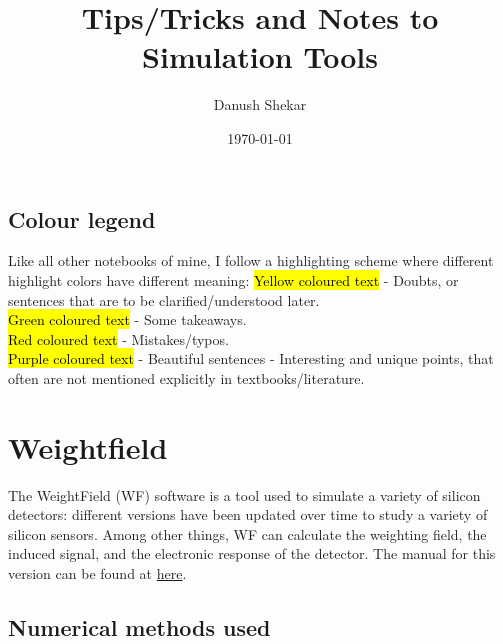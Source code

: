 \documentclass[11pt]{article}
\title{Tips/Tricks and Notes to Simulation Tools}
\author{Danush Shekar}
\date{\today}
\newcommand{\hlyellow}[1]{{\sethlcolor{yellow}\hl{#1}}}
\newcommand{\hlgreen}[1]{{\sethlcolor{green2}\hl{#1}}}
\newcommand{\hlred}[1]{{\sethlcolor{red2}\hl{#1}}}
\newcommand{\hlpurple}[1]{{\sethlcolor{purple2}\hl{#1}}}
\begin{document}
\maketitle
\tableofcontents

\newpage


\subsection*{Colour legend}
Like all other notebooks of mine, I follow a highlighting scheme where different highlight colors have different meaning:
\hlyellow{Yellow coloured text} - Doubts, or sentences that are to be clarified/understood later.\\
\hlgreen{Green coloured text} - Some takeaways.\\
\hlred{Red coloured text} - Mistakes/typos.\\
\hlpurple{Purple coloured text} - Beautiful sentences - Interesting and unique points, that often are not mentioned explicitly in textbooks/literature.\\

\section{Weightfield}
The WeightField (WF) software is a tool used to simulate a variety of silicon detectors: different versions have been updated over time to study a variety of silicon sensors. Among other things, WF can calculate the weighting field, the induced signal, and the electronic response of the detector. The manual for this version can be found at \href{http://personalpages.to.infn.it/~cartigli/Weightfield2/Manual_files/Manual_Weightfield.pdf}{here}.

\subsection{Numerical methods used}
\end{document}
